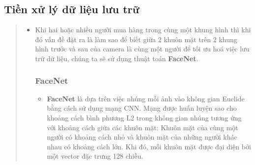 \documentclass{article}
\begin{document}
\subsection{Tiền xử lý dữ liệu lưu trữ}
\begin{quote}
   \begin{itemize}
   \item Khi hai hoặc nhiều người mua hàng trong cùng một khung hình thì khi đó vấn đề đặt ra là làm sao để biết giữa 2 khuôn mặt trên 2 khung hình trước và sau của camera là cùng một người để tối ưu hoá việc lưu trữ dữ liệu, chúng ta sẽ sử dụng thuật toán \textbf{FaceNet}.
   \subsubsection{FaceNet}
   \begin{itemize}
      \item \textbf{FaceNet} là dựa trên việc nhúng mỗi ảnh vào không gian Euclide bằng cách sử dụng mạng CNN. Mạng được huấn luyện sao cho khoảng cách bình phương L2 trong không gian nhúng tương ứng với khoảng cách giữa các khuôn mặt: Khuôn mặt của cùng một người có khoảng cách nhỏ và khuôn mặt của những người khác nhau có khoảng cách lớn. Khi đó, mỗi khuôn mặt được đại diện bởi một vector đặc trưng 128 chiều.
   \end{itemize}


\end{itemize}
\end{quote}
\end{document}
